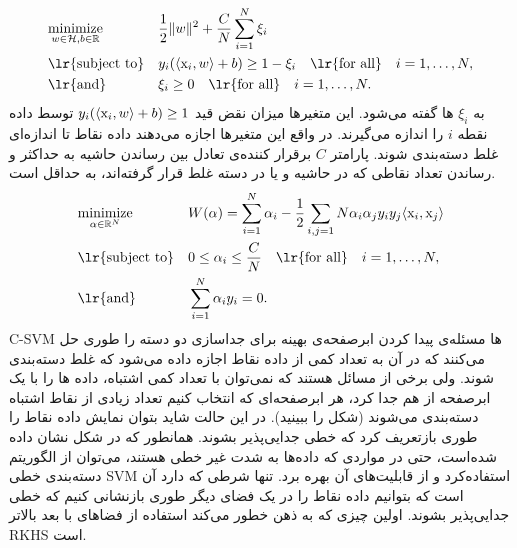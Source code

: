 \begin{equation}\label{eq:c-svm-normal-form}
\begin{aligned}
& \underset{w \in \mH, b \in \R}{\text{minimize}} & & \dfrac{1}{2} \|w\|^2 + \dfrac{C}{N} \sum_{i=1}^{N} \xi_i \\
& \text{\lr{subject to}} & & y_i(\langle \mx_i,w \rangle + b) \geq 1 - \xi_i \quad\text{\lr{for all}}\quad i = 1, \ldots ,N, \\
& \text{\lr{and}} & & \xi_i \geq 0\quad\text{\lr{for all}}\quad i = 1, \ldots ,N.
\end{aligned}
\end{equation}
به $\xi_i$ ها  گفته می‌شود. این متغیرها میزان نقض قید $y_i(\langle \mathrm{x}_i,w \rangle + b) \geq 1$ توسط داده نقطه $i$ را اندازه می‌گیرند. در واقع این متغیرها اجازه می‌دهند داده نقاط تا اندازه‌ای غلط دسته‌بندی شوند. پارامتر $C$ برقرار کننده‌ی تعادل بین رساندن حاشیه به حداکثر و رساندن تعداد نقاطی که در حاشیه و یا در دسته غلط قرار گرفته‌اند، به حداقل است.
\begin{equation}\label{eq:c-svm-dual-form}
\begin{aligned}
& \underset{\alpha \in \R^N}{\text{minimize}} & & W(\alpha)=\sum_{i=1}^{N}\alpha_i - \dfrac{1}{2} \sum_{i,j=1}{N} \alpha_i \alpha_j y_i y_j \langle \mx_i,\mx_j \rangle \\
& \text{\lr{subject to}} & & 0 \leq \alpha_i \leq \dfrac{C}{N} \quad\text{\lr{for all}}\quad i = 1, \ldots ,N, \\
& \text{\lr{and}} & & \sum_{i=1}^{N} \alpha_i y_i = 0.
\end{aligned}
\end{equation}
C-SVM ها مسئله‌ی پیدا کردن ابرصفحه‌ی ‌بهینه برای جداسازی دو دسته را طوری حل می‌کنند که در آن به تعداد کمی از داده نقاط اجازه داده می‌شود که غلط دسته‌بندی شوند. ولی برخی از مسائل هستند که نمی‌توان با تعداد کمی اشتباه، داده ها را با یک ابرصفحه از هم جدا کرد، هر ابرصفحه‌ای که انتخاب کنیم تعداد زیادی از نقاط اشتباه دسته‌بندی می‌شوند (شکل  را ببینید). در این حالت شاید بتوان نمایش داده نقاط را طوری بازتعریف کرد که خطی جدایی‌پذیر بشوند.
همانطور که در شکل   نشان داده شده‌است، حتی در مواردی که داده‌ها به شدت غیر خطی هستند، می‌توان از الگوریتم دسته‌بندی خطی  SVM استفاده‌کرد و از قابلیت‌های آن بهره برد. تنها شرطی که دارد آن است که بتوانیم داده نقاط را در یک فضای دیگر طوری بازنشانی کنیم که خطی جدایی‌پذیر بشوند. اولین چیزی که به ذهن خطور می‌کند استفاده از فضاهای با بعد بالاتر RKHS است.

